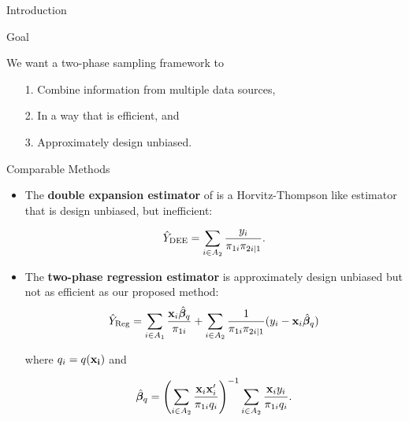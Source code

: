 \documentclass[final]{beamer}
\newlength{\colwidth}
\begin{document}
\begin{frame}[t]
\begin{columns}[t]
\begin{column}{\colwidth}
\begin{block}{Introduction}
  \end{block}

  \vspace{-0.7cm}
  \begin{block}{Goal}

    We want a two-phase sampling framework to

    \begin{itemize}
      \item[1.] Combine information from multiple data sources,
      \item[2.] In a way that is efficient, and
      \item[3.] Approximately design unbiased.
    \end{itemize}

  \end{block}

  \vspace{-0.7cm}
  \begin{block}{Comparable Methods}

    \begin{itemize}
      \item The \textbf{double expansion estimator} of \cite{kott1997can}
        is a Horvitz-Thompson like estimator that is design unbiased, but
        inefficient:

        $$
        \hat Y_{\rm{DEE}} = \sum_{i \in A_2} \frac{y_i}{\pi_{1i}\pi_{2i|1}}.
        $$
      \item The \textbf{two-phase regression estimator} is approximately design
        unbiased but not as efficient as our proposed method:
        $$
        \hat Y_{\rm{Reg}} = 
        \sum_{i \in A_1} \frac{{\bf{x}}_i \hat{\bm{\beta}}_q}{\pi_{1i}} + 
        \sum_{i \in A_2} \frac{1}{\pi_{1i}\pi_{2i|1}}(y_i - 
        {\bf{x}}_i \hat{\bm{\beta}}_q)
        $$

        where $q_i = q(\bf x_i)$ and 
        \vspace{-0.5cm}

        $$
        \hat{\bm \beta}_q = \left(\sum_{i \in A_2} 
        \frac{{\bf{x}}_i {\bf{x}}_i'}{\pi_{1i} q_i}\right)^{-1} 
        \sum_{i \in A_2} \frac{{\bf{x}}_i y_i}{\pi_{1i} q_i}.
        $$

    \end{itemize}

  \end{block}

\end{column}


\end{columns}
\end{frame}
\end{document}
